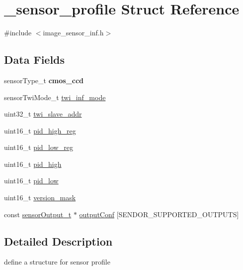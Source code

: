 \hypertarget{struct__sensor__profile}{}\section{\+\_\+sensor\+\_\+profile Struct Reference}
\label{struct__sensor__profile}


{\ttfamily \#include $<$image\+\_\+sensor\+\_\+inf.\+h$>$}

\subsection*{Data Fields}
\begin{DoxyCompactItemize}
\item 
\mbox{\label{struct__sensor__profile_a21451bcfa17f11af95a9de0926e3ca91}} 
sensor\+Type\+\_\+t {\bfseries cmos\+\_\+ccd}
\item 
sensor\+Twi\+Mode\+\_\+t \mbox{\hyperlink{struct__sensor__profile_a4430b6708817fd7531dfcb1ff801489a}{twi\+\_\+inf\+\_\+mode}}
\item 
uint32\+\_\+t \mbox{\hyperlink{struct__sensor__profile_aacbadee8d6c886bfc6b4eae6952d38ce}{twi\+\_\+slave\+\_\+addr}}
\item 
uint16\+\_\+t \mbox{\hyperlink{struct__sensor__profile_a91fd70e552c6111ac836a334546d202d}{pid\+\_\+high\+\_\+reg}}
\item 
uint16\+\_\+t \mbox{\hyperlink{struct__sensor__profile_a2192ed350ad585ffdda6874ad87b85cc}{pid\+\_\+low\+\_\+reg}}
\item 
uint16\+\_\+t \mbox{\hyperlink{struct__sensor__profile_aa248227908e08c5c20c5275912e42858}{pid\+\_\+high}}
\item 
uint16\+\_\+t \mbox{\hyperlink{struct__sensor__profile_af89ce2c7c24007184034191493b4e6f0}{pid\+\_\+low}}
\item 
uint16\+\_\+t \mbox{\hyperlink{struct__sensor__profile_a6292d1fe4fee17efe8ef4a7a8ee58676}{version\+\_\+mask}}
\item 
const \mbox{\hyperlink{struct__sensor__output}{sensor\+Output\+\_\+t}} $\ast$ \mbox{\hyperlink{struct__sensor__profile_a6cb195d94c3891d690f4a5b487f38212}{output\+Conf}} \mbox{[}S\+E\+N\+D\+O\+R\+\_\+\+S\+U\+P\+P\+O\+R\+T\+E\+D\+\_\+\+O\+U\+T\+P\+U\+TS\mbox{]}
\end{DoxyCompactItemize}


\subsection{Detailed Description}
define a structure for sensor profile 

